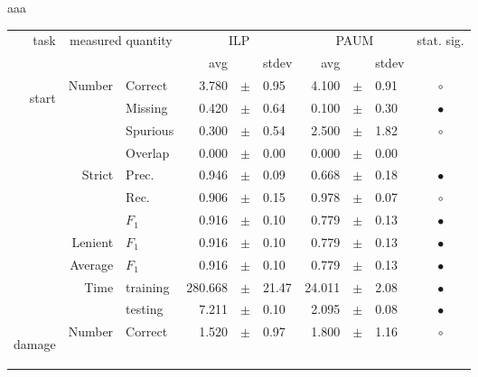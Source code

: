 



\clearpage
aaa

\vspace{1.1cm}


\begin{longtable}{|r|r|l||rcl|rcl|c|}
\hline
\multirow{2}{*}{task} & \multicolumn{2}{|c||}{\multirow{2}{*}{measured quantity}} & \multicolumn{3}{|c|}{ILP} & \multicolumn{3}{|c|}{PAUM} & \multirow{2}{*}{ stat. sig.}\\
\cline{4-9}
  & \multicolumn{2}{|c||}{} &  avg  &    &  stdev  &  avg  &    &  stdev  & \\
\hline
\endhead
\hline
\hline
\multirow{11}{*}{\begin{sideways}start\end{sideways} } & \multirow{4}{*}{Number} &  Correct  & 3.780 &  $\pm$  & 0.95 & 4.100 &  $\pm$  & 0.91 &  $\circ$\\
\cline{3-10}
 &  &  Missing  & 0.420 &  $\pm$  & 0.64 & 0.100 &  $\pm$  & 0.30 &  $\bullet$\\
\cline{3-10}
 &  &  Spurious  & 0.300 &  $\pm$  & 0.54 & 2.500 &  $\pm$  & 1.82 &  $\circ$\\
\cline{3-10}
 &  &  Overlap  & 0.000 &  $\pm$  & 0.00 & 0.000 &  $\pm$  & 0.00 &   \\
\cline{2-10}
 & \multirow{3}{*}{Strict} &  Prec.  & 0.946 &  $\pm$  & 0.09 & 0.668 &  $\pm$  & 0.18 &  $\bullet$\\
\cline{3-10}
 &  &  Rec.  & 0.906 &  $\pm$  & 0.15 & 0.978 &  $\pm$  & 0.07 &  $\circ$\\
\cline{3-10}
 &  &  $F_1$  & 0.916 &  $\pm$  & 0.10 & 0.779 &  $\pm$  & 0.13 &  $\bullet$\\
\cline{2-10}
 & Lenient &  $F_1$  & 0.916 &  $\pm$  & 0.10 & 0.779 &  $\pm$  & 0.13 &  $\bullet$\\
\cline{2-10}
 & Average &  $F_1$  & 0.916 &  $\pm$  & 0.10 & 0.779 &  $\pm$  & 0.13 &  $\bullet$\\
\cline{2-10}
 & \multirow{2}{*}{Time} &  training  & 280.668 &  $\pm$  & 21.47 & 24.011 &  $\pm$  & 2.08 &  $\bullet$\\
\cline{3-10}
 &  &  testing  & 7.211 &  $\pm$  & 0.10 & 2.095 &  $\pm$  & 0.08 &  $\bullet$\\
\hline
\hline
\multirow{11}{*}{\begin{sideways}damage\end{sideways} } & \multirow{4}{*}{Number} &  Correct  & 1.520 &  $\pm$  & 0.97 & 1.800 &  $\pm$  & 1.16 &  $\circ$\\

\end{longtable}
